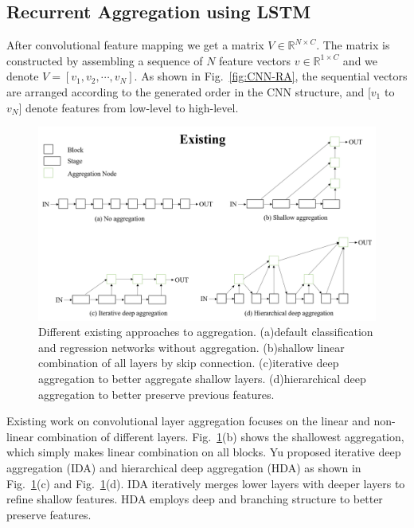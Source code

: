 \documentclass[runningheads]{llncs}
\begin{document}
\subsection{Recurrent Aggregation using LSTM}
After convolutional feature mapping we get a matrix $V\in \mathbb{R}^{N\times C}$. The matrix is constructed by assembling a sequence of $N$ feature vectors $v \in \mathbb{R}^{1\times C}$ and we denote $V=[v_1, v_2, \cdots, v_N]$. As shown in Fig.~\ref{fig:CNN-RA}, the sequential vectors are arranged according to the generated order in the CNN structure, and $[v_1$ to $v_N]$ denote features from low-level  to high-level. 
\begin{figure}  
	\centering
	\includegraphics[width=13cm]{Figures/existed_aggr.png}
	\caption{Different existing approaches to aggregation. (a)default classification and regression networks without aggregation. (b)shallow linear combination of all layers by skip connection. (c)iterative deep aggregation to better aggregate shallow layers. (d)hierarchical deep aggregation to better preserve previous features.}
	\label{fig:exited_aggr}
\end{figure}
Existing work on convolutional layer aggregation focuses on the linear and non-linear combination of different layers. Fig.~\ref{fig:exited_aggr}(b) shows the shallowest aggregation, which simply makes linear combination on all blocks. Yu\cite{dla} proposed iterative deep aggregation (IDA) and hierarchical deep aggregation (HDA) as shown in Fig.~\ref{fig:exited_aggr}(c) and Fig.~\ref{fig:exited_aggr}(d).  IDA iteratively merges lower layers with deeper layers to refine shallow features. HDA employs deep and branching structure to better preserve features.
\end{document}
